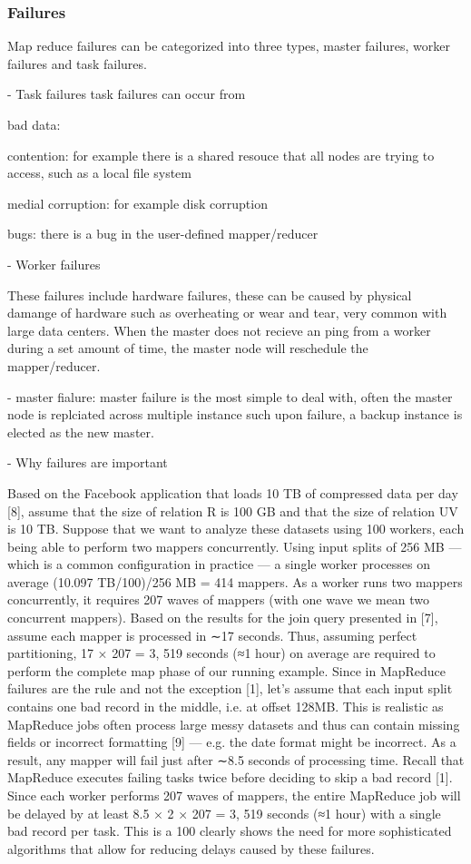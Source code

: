 \documentclass[10pt,twocolumn]{IEEEtran11}
\begin{document}
\subsubsection{Failures}
Map reduce failures can be categorized into three types, master failures, worker failures and task failures.

- Task failures
task failures can occur from

bad data:

contention:
    for example there is a shared resouce that all nodes are trying to access, such as a local file system

medial corruption:
    for example disk corruption
    
bugs:
    there is a bug in the user-defined mapper/reducer
    

- Worker failures

These failures include hardware failures, these can be caused by physical damange of hardware such as overheating or wear and tear, very common with large data centers. When the master does not recieve an ping from a worker during a set amount of time, the master node will reschedule the mapper/reducer.

- master fialure:
master failure is the most simple to deal with, often the master node is replciated across multiple instance such upon failure, a backup instance is elected as the new master.


- Why failures are important

Based on the Facebook
application that loads 10 TB of compressed data per day [8],
assume that the size of relation R is 100 GB and that the size
of relation UV is 10 TB. Suppose that we want to analyze these
datasets using 100 workers, each being able to perform two
mappers concurrently. Using input splits of 256 MB — which
is a common configuration in practice — a single worker processes
on average (10.097 TB/100)/256 MB = 414 mappers.
As a worker runs two mappers concurrently, it requires 207
waves of mappers (with one wave we mean two concurrent
mappers). Based on the results for the join query presented
in [7], assume each mapper is processed in ∼17 seconds. Thus,
assuming perfect partitioning, 17 × 207 = 3, 519 seconds (≈1
hour) on average are required to perform the complete map
phase of our running example.
Since in MapReduce failures are the rule and not the
exception [1], let’s assume that each input split contains one
bad record in the middle, i.e. at offset 128MB. This is realistic
as MapReduce jobs often process large messy datasets and
thus can contain missing fields or incorrect formatting [9] —
e.g. the date format might be incorrect. As a result, any mapper
will fail just after ∼8.5 seconds of processing time. Recall that
MapReduce executes failing tasks twice before deciding to
skip a bad record [1]. Since each worker performs 207 waves
of mappers, the entire MapReduce job will be delayed by at
least 8.5 × 2 × 207 = 3, 519 seconds (≈1 hour) with a single
bad record per task. This is a 100%
clearly shows the need for more sophisticated algorithms that
allow for reducing delays caused by these failures.
\end{document}
